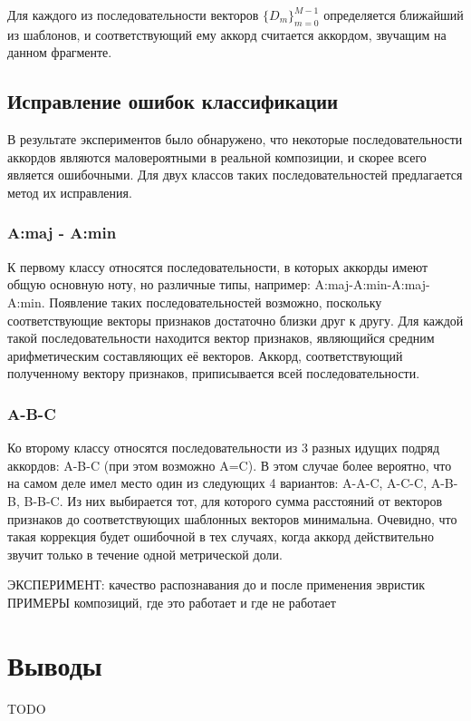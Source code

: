 Для каждого из последовательности векторов $\{D_m\}_{m=0}^{M-1}$ определяется
ближайший из шаблонов, и соответствующий ему аккорд считается аккордом, звучащим
на данном фрагменте.

\subsection{Исправление ошибок классификации} \label{ssect1_errcorr}

В результате экспериментов было обнаружено, что некоторые последовательности
аккордов являются маловероятными в реальной композиции, и скорее всего является
ошибочными. Для двух классов таких последовательностей предлагается метод их
исправления.

\subsubsection{A:maj - A:min}

К первому классу относятся последовательности, в которых аккорды имеют общую
основную ноту, но различные типы, например: A:maj-A:min-A:maj-A:min. Появление
таких последовательностей возможно, поскольку соответствующие векторы признаков
достаточно близки друг к другу. Для каждой такой последовательности находится
вектор признаков, являющийся средним арифметическим составляющих её векторов.
Аккорд, соответствующий полученному вектору признаков, приписывается всей
последовательности.

\subsubsection{A-B-C}

Ко второму классу относятся последовательности из 3 разных идущих подряд
аккордов: A-B-C (при этом возможно A=C). В этом случае более вероятно, что на
самом деле имел место один из следующих 4 вариантов: A-A-C, A-C-C, A-B-B,
B-B-C. Из них выбирается тот, для которого сумма расстояний от векторов
признаков до соответствующих шаблонных векторов минимальна. Очевидно, что такая
коррекция будет ошибочной в тех случаях, когда аккорд действительно звучит
только в течение одной метрической доли.

ЭКСПЕРИМЕНТ: качество распознавания до и после применения эвристик
ПРИМЕРЫ композиций, где это работает и где не работает

\section{Выводы}

TODO


\clearpage